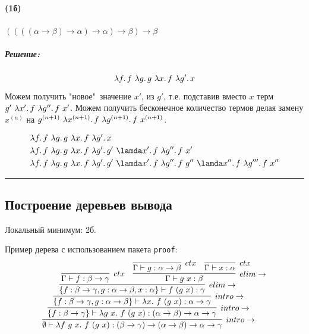 \documentclass{article}
\newenvironment{proof}{\subparagraph{\hspace{-1em}Решение:\newline}\-}{\par\noindent\rule{\textwidth}{0.4pt}}
\newcommand{\ap}{~}
\begin{document}
    \paragraph{(1б)} $((((\alpha \to \beta) \to \alpha) \to \alpha) \to \beta) \to \beta$

    \begin{proof}
        \[ \lambda f\ldotp f \ap \lambda g\ldotp g \ap \lambda x\ldotp f \ap \lambda g'\ldotp x \]
        Можем получить "новое"\ значение \(x'\), из \(g'\), т.е. подставив вместо \(x\) терм \(g' \ap \lambda x'\ldotp f \ap \lambda g''\ldotp f \ap x'\). Можем получить бесконечное количество термов делая замену \(x^{(n)}\) на \(g^{(n + 1)} \ap \lambda x^{(n + 1)}\ldotp f \ap \lambda g^{(n + 1)}\ldotp f \ap x^{(n + 1)}\).

        \begin{align}
            & \lambda f\ldotp f \ap \lambda g\ldotp g \ap \lambda x\ldotp f \ap \lambda g'\ldotp x \\
            & \lambda f\ldotp f \ap \lambda g\ldotp g \ap \lambda x\ldotp f \ap \lambda g'\ldotp g' \ap \lamda x'\ldotp f \ap \lambda g''\ldotp f \ap x' \\
            & \lambda f\ldotp f \ap \lambda g\ldotp g \ap \lambda x\ldotp f \ap \lambda g'\ldotp g' \ap \lamda x'\ldotp f \ap \lambda g''\ldotp f \ap g'' \ap \lamda x''\ldotp f \ap \lambda g'''\ldotp f \ap x''
        \end{align}
    \end{proof}

    \subsection{Построение деревьев вывода}

    Локальный минимум: 2б.

    Пример дерева с использованием пакета \texttt{proof}:
    \[\resizebox{0.8\hsize}{!}{
        \infer[intro\to]
        {\emptyset \vdash \lambda f~g~x.~f~(g~x) : (\beta \to \gamma) \to (\alpha \to \beta) \to \alpha \to \gamma}
        {
            \infer[intro\to]
            {\{f: \beta \to \gamma\} \vdash \lambda g~x.~f~(g~x) : (\alpha \to \beta) \to \alpha \to \gamma}
            {
                \infer[intro\to]
                {\{f : \beta \to \gamma, g : \alpha \to \beta\} \vdash \lambda x.~f~(g~x) : \alpha \to \gamma}
                {
                    \infer[elim\to]{\{f : \beta \to \gamma, g : \alpha \to \beta, x:  \alpha\} \vdash f~(g~x) : \gamma}
                    {
                        \infer[ctx]{\Gamma \vdash f : \beta \to \gamma}{} &
                        \infer[elim\to]{\Gamma \vdash g~x : \beta}{
                            \infer[ctx]{\Gamma \vdash g : \alpha \to \beta}{} &
                            \infer[ctx]{\Gamma \vdash x : \alpha}{}
                        }
                    }
                }
            }
        }
    }\]
\end{document}
